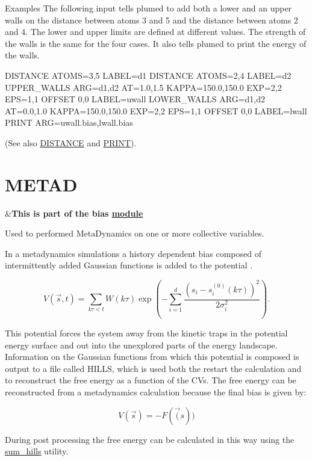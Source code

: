 \begin{DoxyParagraph}{Examples}
The following input tells plumed to add both a lower and an upper walls on the distance between atoms 3 and 5 and the distance between atoms 2 and 4. The lower and upper limits are defined at different values. The strength of the walls is the same for the four cases. It also tells plumed to print the energy of the walls. \begin{DoxyVerb}DISTANCE ATOMS=3,5 LABEL=d1
DISTANCE ATOMS=2,4 LABEL=d2
UPPER_WALLS ARG=d1,d2 AT=1.0,1.5 KAPPA=150.0,150.0 EXP=2,2 EPS=1,1 OFFSET 0,0 LABEL=uwall
LOWER_WALLS ARG=d1,d2 AT=0.0,1.0 KAPPA=150.0,150.0 EXP=2,2 EPS=1,1 OFFSET 0,0 LABEL=lwall
PRINT ARG=uwall.bias,lwall.bias
\end{DoxyVerb}
 (See also \hyperlink{DISTANCE}{D\+I\+S\+T\+A\+N\+C\+E} and \hyperlink{PRINT}{P\+R\+I\+N\+T}). 
\end{DoxyParagraph}
\hypertarget{METAD}{}\section{M\+E\+T\+A\+D}\label{METAD}
\begin{TabularC}{2}
\hline
&{\bfseries  This is part of the bias \hyperlink{mymodules}{module }}   \\
\end{TabularC}
Used to performed Meta\+Dynamics on one or more collective variables.

In a metadynamics simulations a history dependent bias composed of intermittently added Gaussian functions is added to the potential \cite{metad}.

\[ V(\vec{s},t) = \sum_{ k \tau < t} W(k \tau) \exp\left( -\sum_{i=1}^{d} \frac{(s_i-s_i^{(0)}(k \tau))^2}{2\sigma_i^2} \right). \]

This potential forces the system away from the kinetic traps in the potential energy surface and out into the unexplored parts of the energy landscape. Information on the Gaussian functions from which this potential is composed is output to a file called H\+I\+L\+L\+S, which is used both the restart the calculation and to reconstruct the free energy as a function of the C\+Vs. The free energy can be reconstructed from a metadynamics calculation because the final bias is given by\+:

\[ V(\vec{s}) = -F(\vec(s)) \]

During post processing the free energy can be calculated in this way using the \hyperlink{sum_hills}{sum\+\_\+hills} utility.

